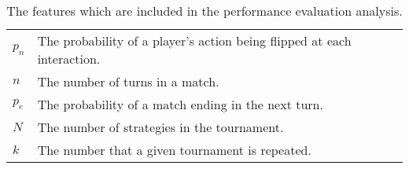 \begin{table}[!htbp]
\begin{center}
{\begin{tabular}{ll}
$p_n$                       & The probability of a player's action being flipped at each interaction. \\
$n$                         & The number of turns in a match. \\
$p_e$                       & The probability of a match ending in the next turn. \\
$N$                         & The number of strategies in the tournament. \\
$k$                         & The number that a given tournament is repeated. \\
    \bottomrule
        \end{tabular}}
    \end{center}
    \caption{The features which are included in the performance evaluation analysis.}\label{table:parameters_summary}
\end{table}

